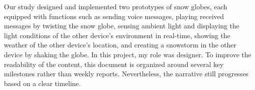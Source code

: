 Our study designed and implemented two prototypes of snow globes, each equipped with functions such as sending voice messages, playing received messages by twisting the snow globe, sensing ambient light and displaying the light conditions of the other device's environment in real-time, showing the weather of the other device's location, and creating a snowstorm in the other device by shaking the globe. In this project, my role was designer. To improve the readability of the content, this document is organized around several key milestones rather than weekly reports. Nevertheless, the narrative still progresses based on a clear timeline.